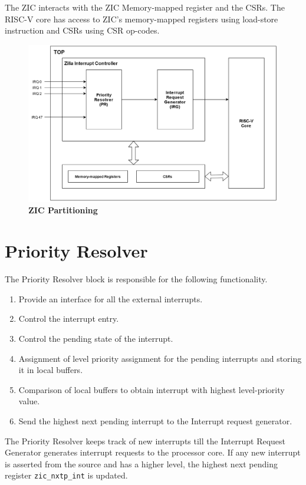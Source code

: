 The ZIC interacts with the ZIC Memory-mapped register and the CSRs. The RISC-V core has access to ZIC's memory-mapped registers using load-store instruction and CSRs using CSR op-codes.

\vspace{1cm}
\begin{figure}[H]
    \centering
    \includegraphics[width = 14cm]{images/ZIC.png}
    \vspace{1cm}
    \caption{\textbf{ZIC Partitioning}}
    \label{fig:zic_partitioning}
\end{figure}

\section{Priority Resolver}
\label{sec:priority-resolve}
The Priority Resolver block is responsible for  the following functionality.
\begin{enumerate}
    \item Provide an interface for all the external interrupts.
    \item Control the interrupt entry.
    \item Control the pending state of the interrupt.
    \item Assignment of level priority assignment for the pending interrupts and storing it in local buffers.
    \item Comparison of local buffers to obtain interrupt with highest level-priority value.
    \item Send the highest next pending interrupt to the Interrupt request generator.
\end{enumerate}

The Priority Resolver keeps track of new interrupts till the Interrupt Request Generator generates interrupt requests to the processor core. If any new interrupt is asserted from the source and has a higher level, the highest next pending register \texttt{zic\_nxtp\_int} is updated.

